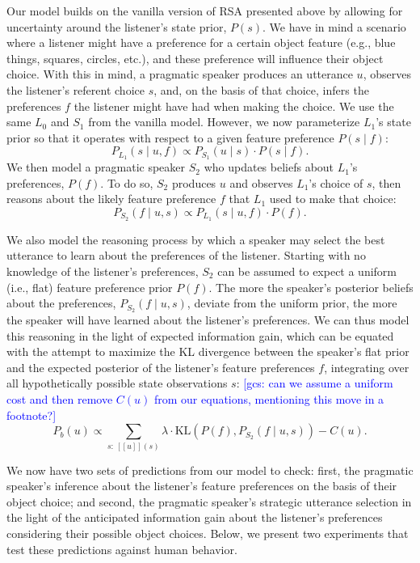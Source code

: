 \documentclass[10pt,a4paper]{article}
\newcommand{\gcs}[1]{\textcolor{blue}{[gcs: #1]}}
\begin{document}
Our model builds on the vanilla version of RSA presented above by allowing for uncertainty around the listener's state prior, $P(s)$. %
We have in mind a scenario where a listener might have a preference for a certain object feature (e.g., blue things, squares, circles, etc.), and these preference will influence their object choice. With this in mind, a pragmatic speaker produces an utterance $u$, observes the listener's referent choice $s$, and, on the basis of that choice, infers the preferences $f$ the listener might have had when making the choice.
We use the same $L_0$ and $S_1$ from the vanilla model. However, we now parameterize $L_1$'s state prior so that it operates with respect to a given feature preference $P(s\mid f)$:
$$P_{L_{1}}(s\mid u,f) \propto P_{S_{1}}(u\mid s) \cdot P(s\mid f).$$
We then model a pragmatic speaker $S_2$ who updates beliefs about $L_1$'s preferences, $P(f)$. To do so, $S_2$ produces $u$ and observes $L_1$'s choice of $s$, then reasons about the likely feature preference $f$ that $L_1$ used to make that choice:
$$P_{S_{2}}(f\mid u,s) \propto P_{L_{1}}(s\mid u,f) \cdot P(f).$$

We also model the reasoning process by which a speaker may select the best utterance to learn about the preferences of the listener.
Starting with no knowledge of the listener's preferences, $S_2$ can be assumed to expect a uniform (i.e., flat) feature preference prior $P(f)$. The more the speaker's posterior beliefs about the preferences, $P_{S_{2}}(f\mid u,s)$, deviate from the uniform prior, the more the speaker will have learned about the listener's preferences. 
We can thus model this reasoning in the light of expected information gain, which can be equated with the attempt to maximize the KL divergence between the speaker's flat prior and the expected posterior of the listener's feature preferences $f$, integrating over all hypothetically possible state observations $s$: \gcs{can we assume a uniform cost and then remove $C(u)$ from our equations, mentioning this move in a footnote?}
$$P_{b}(u) \propto \sum_{s:\  [\![u]\!](s)}\lambda \cdot \textrm{KL}(P(f),P_{S_{2}}(f\mid u,s))-C(u).$$

We now have two sets of predictions from our model to check: first, the pragmatic speaker's inference about the listener's feature preferences on the basis of their object choice; and second, the pragmatic speaker's strategic utterance selection in the light of the anticipated information gain about the listener's preferences considering their possible object choices. Below, we present two experiments that test these predictions against human behavior.
\end{document}
